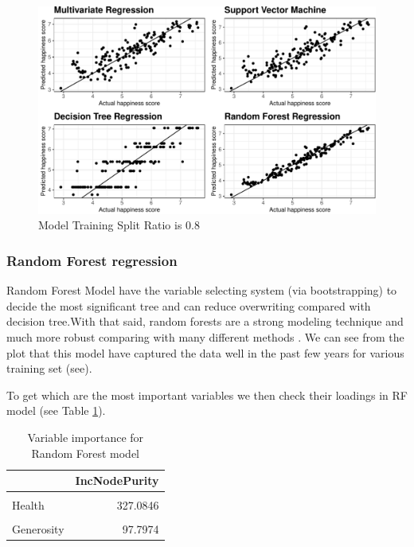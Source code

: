 \documentclass[11pt,a4paper,]{article}
\begin{document}
\newpage

\begin{figure}
\centering
\includegraphics{Assignment4_files/figure-latex/training-1.pdf}
\caption{\label{fig:training}Model Training Split Ratio is 0.8}
\end{figure}

\hypertarget{random-forest-regression}{%
\subsubsection{Random Forest regression}\label{random-forest-regression}}

Random Forest Model have the variable selecting system (via bootstrapping) to decide the most significant tree and can reduce overwriting compared with decision tree.With that said, random forests are a strong modeling technique and much more robust comparing with many different methods \autocite{liberman2017}. We can see from the plot that this model have captured the data well in the past few years for various training set (see).

To get which are the most important variables we then check their loadings in RF model (see Table \ref{tab:varimp}).

\begin{table}

\caption{\label{tab:varimp}Variable importance for Random Forest model}
\centering
\begin{tabular}[t]{l|r}
\hline
  & IncNodePurity\\
\hline
\cellcolor{gray!6}{Economy} & \cellcolor{gray!6}{348.6690}\\
\hline
Health & 327.0846\\
\hline
\cellcolor{gray!6}{Freedom} & \cellcolor{gray!6}{169.3299}\\
\hline
Generosity & 97.7974\\
\hline
\end{tabular}
\end{table}
\end{document}
